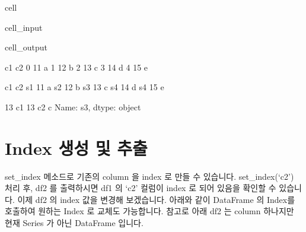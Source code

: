 \documentclass[letterpaper,10pt,english]{jupyterBook}
\begin{document}
\begin{sphinxuseclass}{cell}
\begin{sphinxVerbatimInput}
\begin{sphinxuseclass}{cell_input}
\end{sphinxuseclass}\end{sphinxVerbatimInput}
\begin{sphinxVerbatimOutput}

\begin{sphinxuseclass}{cell_output}
\begin{sphinxVerbatim}[commandchars=\\\{\}]
   c1 c2
0  11  a
1  12  b
2  13  c
3  14  d
4  15  e


    c1 c2
s1  11  a
s2  12  b
s3  13  c
s4  14  d
s4  15  e


13
c1    13
c2     c
Name: s3, dtype: object
\end{sphinxVerbatim}

\end{sphinxuseclass}\end{sphinxVerbatimOutput}

\end{sphinxuseclass}

\section{Index 생성 및 추출}
\label{\detokenize{chapter2/2.1.2_Python_Basics:id2}}
\sphinxAtStartPar
set\_index 메소드로 기존의 column 을 index 로 만들 수 있습니다. set\_index(‘c2’) 처리 후, df2 를 출력하시면 df1 의 ‘c2’ 컬럼이 index 로 되어 있음을 확인할 수 있습니다.
이제 df2 의 index 값을 변경해 보겠습니다. 아래와 같이 DataFrame 의 Index를 호출하여 원하는 Index 로 교체도 가능합니다. 참고로 아래 df2 는 column 하나지만 현재 Series 가 아닌 DataFrame 입니다.
\end{document}
